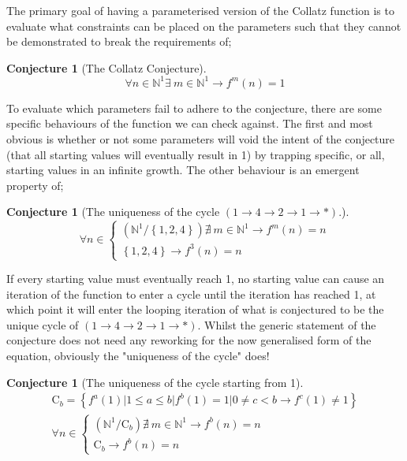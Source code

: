 \documentclass[12pt,a4paper]{amsart}
\numberwithin{equation}{section}
\theoremstyle{plain}
\theoremstyle{definition}
\newtheorem{Conj}[Th]{Conjecture}
\begin{document}
The primary goal of having a parameterised version of the Collatz function is to evaluate what constraints can be placed on the parameters such that they cannot be demonstrated to break the requirements of;

\begin{Conj}[The Collatz Conjecture]
\begin{equation}
\forall n \in \mathbb{N}^{1} \exists \: m \in \mathbb{N}^{1} \rightarrow f^{m}\left ( n \right )=1
\end{equation}
\end{Conj}

To evaluate which parameters fail to adhere to the conjecture, there are some specific behaviours of the function we can check against. The first and most obvious is whether or not some parameters will void the intent of the conjecture (that all starting values will eventually result in 1) by trapping specific, or all, starting values in an infinite growth. The other behaviour is an emergent property of;

\begin{Conj}[The uniqueness of the cycle $ \left ( 1\rightarrow 4\rightarrow 2\rightarrow 1\rightarrow * \right ) $.]
\begin{equation}
\forall n \in \left\{\begin{matrix}
\left ( \mathbb{N}^{1}/\left \{ 1,2,4 \right \} \right ) \nexists \: m \in \mathbb{N}^{1} \rightarrow f^{m}\left ( n \right )=n \\ 
\left \{ 1,2,4 \right \} \rightarrow f^{3}\left ( n \right )=n
\end{matrix} \right.
\end{equation}
\end{Conj}

If every starting value must eventually reach 1, no starting value can cause an iteration of the function to enter a cycle until the iteration has reached 1, at which point it will enter the looping iteration of what is conjectured to be the unique cycle of $ \left ( 1\rightarrow 4\rightarrow 2\rightarrow 1\rightarrow * \right ) $. Whilst the generic statement of the conjecture does not need any reworking for the now generalised form of the equation, obviously the "uniqueness of the cycle" does!

\begin{Conj}[The uniqueness of the cycle starting from 1]
\begin{equation}
\begin{matrix}
\mathrm{C}_{b} = \left \{ f^{a} \left ( 1 \right ) | 1 \leq a \leq b | f^{b} \left ( 1 \right ) = 1 | 0 \neq c < b \rightarrow f^{c} \left ( 1 \right ) \neq 1 \right \} \\
\forall n \in \left\{\begin{matrix}
\left ( \mathbb{N}^{1}/\mathrm{C}_{b} \right ) \nexists \: m \in \mathbb{N}^{1} \rightarrow f^{b}\left ( n \right )=n \\ 
\mathrm{C}_{b} \rightarrow f^{b}\left ( n \right )=n
\end{matrix} \right.
\end{matrix}
\end{equation}
\end{Conj}
\end{document}
